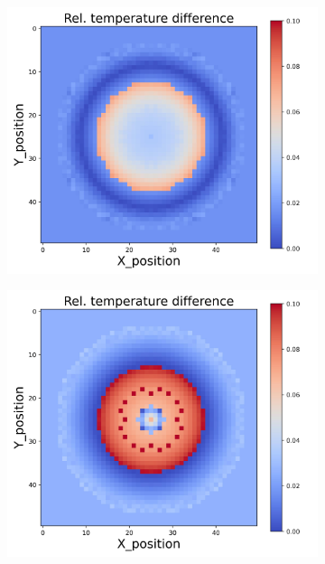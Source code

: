 {\begin{figure}[h]
    \begin{minipage}{\textwidth}
        \centering
        \begin{subfigure}{0.28\textwidth}
            \centering
            \includegraphics[width=\textwidth]{figures/raw_data/22/linear/T_bias.jpg}
        \end{subfigure}
        \begin{subfigure}{0.28\textwidth}
            \centering
            \includegraphics[width=\textwidth]{figures/raw_data/23/linear/T_bias.jpg}

\end{subfigure}
\end{minipage}
\end{figure}}
